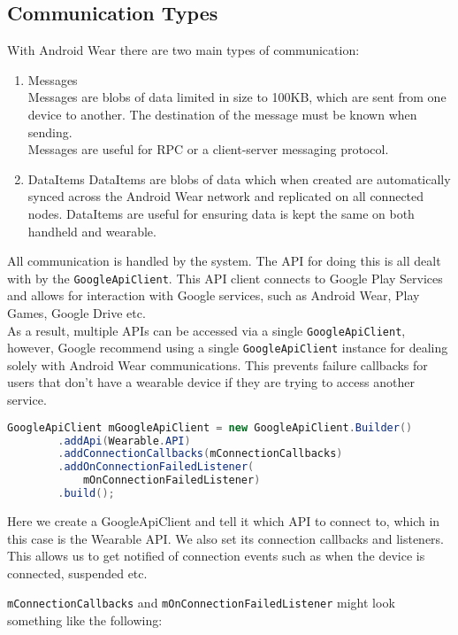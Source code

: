 \subsection{Communication Types}
With Android Wear there are two main types of communication:
\begin{enumerate}
\item Messages\\
    Messages are blobs of data limited in size to 100KB, which are sent from one
    device to another. The destination of the message must be known when
    sending.\\
    Messages are useful for RPC or a client-server messaging protocol.
\item DataItems
    DataItems are blobs of data which when created are automatically synced
    across the Android Wear network and replicated on all connected nodes.
    DataItems are useful for ensuring data is kept the same on both handheld and
    wearable.
\end{enumerate}

All communication is handled by the system. The API for doing this is all dealt
with by the \texttt{GoogleApiClient}. This API client connects to Google Play
Services and allows for interaction with Google services, such as Android Wear,
Play Games, Google Drive etc.\\
As a result, multiple APIs can be accessed via a single
\texttt{GoogleApiClient}, however, Google recommend using a single
\texttt{GoogleApiClient} instance for dealing solely with Android Wear
communications. This prevents failure callbacks for users that don't have a
wearable device if they are trying to access another service.

\begin{lstlisting}[language=Java]
GoogleApiClient mGoogleApiClient = new GoogleApiClient.Builder()
        .addApi(Wearable.API)
        .addConnectionCallbacks(mConnectionCallbacks)
        .addOnConnectionFailedListener(
            mOnConnectionFailedListener)
        .build();
\end{lstlisting}

Here we create a GoogleApiClient and tell it which API to connect to, which in
this case is the Wearable API. We also set its connection callbacks and
listeners.
This allows us to get notified of connection events such as when the device is
connected, suspended etc.

\texttt{mConnectionCallbacks} and \texttt{mOnConnectionFailedListener} might
look something like the following:

